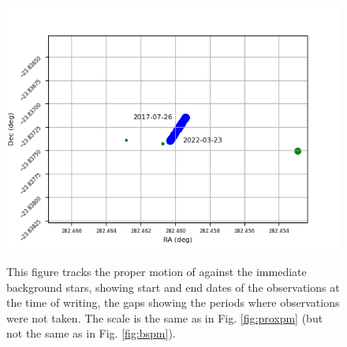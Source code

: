 \begin{figure}[!htbp]
\begin{center}
\includegraphics[scale=0.9]{images/pmross.png} \\
\end{center}   
\caption{This figure tracks the proper motion of {\ross} against the immediate
background stars, showing start and end dates of the observations at the time
of writing, the gaps showing the periods where observations were not taken.
The scale is the same as in Fig. \ref{fig:proxpm} (but not the same as in Fig. \ref{fig:bspm}).}
\protect\label{fig:rosspm}
\end{figure}

\clearpage
